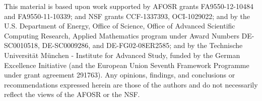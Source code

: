 This material is based upon work supported by AFOSR grants
FA9550-12-10484 and FA9550-11-10339; and NSF grants CCF-1337393,
OCI-1029022; and by the U.S. Department of Energy, Office of Science,
Office of Advanced Scientific Computing Research, Applied Mathematics
program under Award Numbers DE-SC0010518, DE-SC0009286, and
DE-FG02-08ER2585; and by the Technische Universit\"{a}t M\"{u}nchen -
Institute for Advanced Study, funded by the German Excellence
Initiative (and the European Union Seventh Framework Programme under
grant agreement 291763).  Any opinions, findings, and conclusions or
recommendations expressed herein are those of the authors and do not
necessarily reflect the views of the AFOSR or the NSF.
